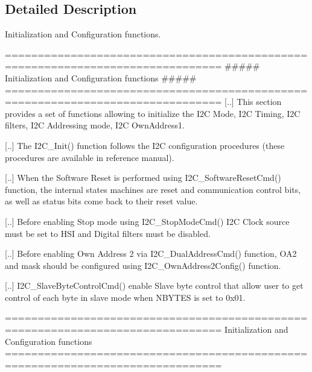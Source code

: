 \subsection{Detailed Description}
Initialization and Configuration functions. \begin{DoxyVerb} ===============================================================================
           ##### Initialization and Configuration functions #####
 ===============================================================================
    [..] This section provides a set of functions allowing to initialize the I2C Mode,
         I2C Timing, I2C filters, I2C Addressing mode, I2C OwnAddress1.

    [..] The I2C_Init() function follows the I2C configuration procedures (these procedures 
         are available in reference manual).
         
    [..] When the Software Reset is performed using I2C_SoftwareResetCmd() function, the internal
         states machines are reset and communication control bits, as well as status bits come 
         back to their reset value.
         
    [..] Before enabling Stop mode using I2C_StopModeCmd() I2C Clock source must be set to
         HSI and Digital filters must be disabled.
         
    [..] Before enabling Own Address 2 via I2C_DualAddressCmd() function, OA2 and mask should be
         configured using I2C_OwnAddress2Config() function.
         
    [..] I2C_SlaveByteControlCmd() enable Slave byte control that allow user to get control of 
         each byte in slave mode when NBYTES is set to 0x01. \end{DoxyVerb}


\begin{DoxyVerb} ===============================================================================
                   Initialization and Configuration functions
 ===============================================================================  \end{DoxyVerb}
 

